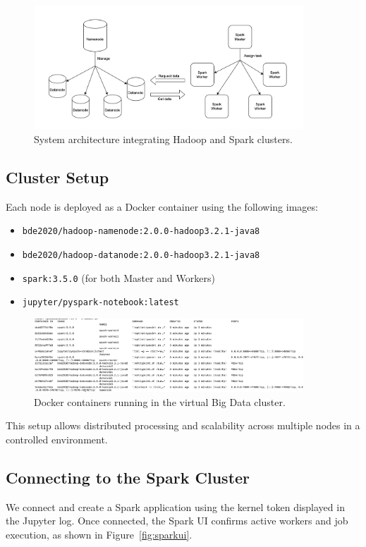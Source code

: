 \documentclass[12pt,a4paper]{article}
\begin{document}
\begin{figure}[H]
    \centering
    \includegraphics[width=0.9\textwidth]{architecture.png}
    \caption{System architecture integrating Hadoop and Spark clusters.}
\end{figure}

\subsection{Cluster Setup}
Each node is deployed as a Docker container using the following images:

\begin{itemize}
    \item \texttt{bde2020/hadoop-namenode:2.0.0-hadoop3.2.1-java8}
    \item \texttt{bde2020/hadoop-datanode:2.0.0-hadoop3.2.1-java8}
    \item \texttt{spark:3.5.0} (for both Master and Workers)
    \item \texttt{jupyter/pyspark-notebook:latest}
\end{itemize}

\begin{figure}[H]
    \centering
    \includegraphics[width=0.9\textwidth]{virtual_cluster.png}
    \caption{Docker containers running in the virtual Big Data cluster.}
\end{figure}

This setup allows distributed processing and scalability across multiple nodes in a controlled environment.

\subsection{Connecting to the Spark Cluster}
We connect and create a Spark application using the kernel token displayed in the Jupyter log.  
Once connected, the Spark UI confirms active workers and job execution, as shown in Figure~\ref{fig:sparkui}.
\end{document}
